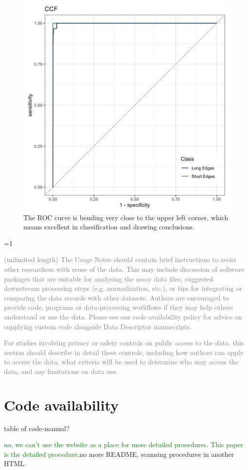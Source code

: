 \documentclass[fleqn,10pt]{wlscirep}
\newcommand{\tom}[1]{{\textcolor{RedOrange}{#1}}}
\newcommand{\hh}[1]{{\textcolor{Green}{#1}}}
\newcommand{\ifinstruction}{1} %
\begin{document}
\begin{figure}[ht]
\centering
\includegraphics[width=0.5\linewidth]{ccf_ROC.png}
\caption{The ROC curve is bending very close to the upper left corner, which means excellent in classification and drawing conclusions.}
\label{fig-ccf-ROC}
\end{figure}

\ifnum \ifinstruction=1

\textcolor{gray}{(unlimited length) The Usage Notes should contain brief instructions to assist other researchers with reuse of the data. This may include discussion of software packages that are suitable for analysing the assay data files, suggested downstream processing steps (e.g. normalization, etc.), or tips for integrating or comparing the data records with other datasets. Authors are encouraged to provide code, programs or data-processing workflows if they may help others understand or use the data. Please see our code availability policy for advice on supplying custom code alongside Data Descriptor manuscripts.}

\textcolor{gray}{For studies involving privacy or safety controls on public access to the data, this section should describe in detail these controls, including how authors can apply to access the data, what criteria will be used to determine who may access the data, and any limitations on data use.}
\fi

\section{Code availability}\label{sec-code-availability}

\tom{table of code-manual?}

\hh{no, we can't use the website as a place for more detailed procedures. This paper is the detailed procedure.}\tom{no more README, scanning procedures in another HTML}
\end{document}
